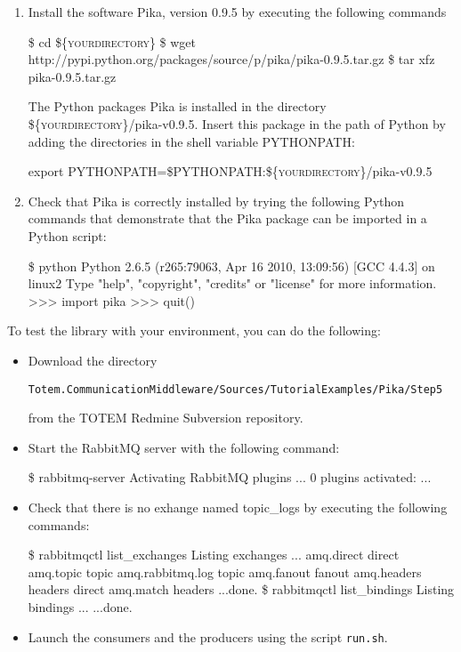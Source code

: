 \begin{enumerate}
\item Install the software Pika, version 0.9.5 by executing the following commands
\begin{shellcmd}
\$ cd \textsc{\$\{yourdirectory\}}
\$ wget http://pypi.python.org/packages/source/p/pika/pika-0.9.5.tar.gz
\$ tar xfz pika-0.9.5.tar.gz
\end{shellcmd}
The Python packages Pika is installed in the directory
\textsf{\textsc{\$\{yourdirectory\}}/pika-v0.9.5}.  Insert this
package in the path of Python by adding the directories in the shell
variable \textsf{PYTHONPATH}:
\begin{shellcmd}
export PYTHONPATH=\$PYTHONPATH:\textsc{\$\{yourdirectory\}}/pika-v0.9.5
\end{shellcmd}
\item Check that Pika is correctly installed by trying the following
  Python commands that demonstrate that the Pika package can be
  imported in a Python script:
\begin{shellcmd}
\$ python
Python 2.6.5 (r265:79063, Apr 16 2010, 13:09:56) 
[GCC 4.4.3] on linux2
Type "help", "copyright", "credits" or "license" for more information.
>>> import pika
>>> quit()
\end{shellcmd}
\end{enumerate}

To test the library with your environment, you can do the following:
\begin{itemize}
\item Download the
  directory \begin{small}\texttt{Totem.CommunicationMiddleware/Sources/TutorialExamples/Pika/Step5}\end{small}
  from the TOTEM Redmine Subversion repository.
\item Start the \textsf{RabbitMQ} server with the following command:
\begin{shellcmd}
\$ rabbitmq-server
Activating RabbitMQ plugins ...
0 plugins activated:
...
\end{shellcmd}
\item Check that there is no exhange named \textsf{topic\_logs} by
  executing the following commands:
\begin{shellcmd}
\$ rabbitmqctl list\_exchanges
Listing exchanges ...
amq.direct	direct
amq.topic	topic
amq.rabbitmq.log	topic
amq.fanout	fanout
amq.headers	headers
	direct
amq.match	headers
...done.
\$ rabbitmqctl list\_bindings
Listing bindings ...
...done.
\end{shellcmd}
\item Launch the consumers and the producers using the script
  \texttt{run.sh}.
\end{itemize}


